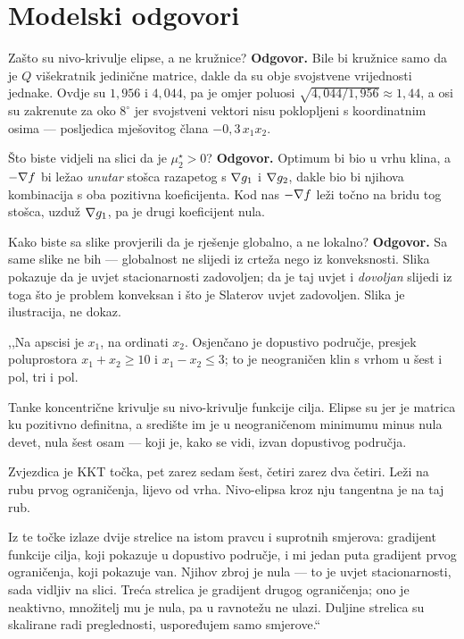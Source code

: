 \section{Modelski odgovori}
\label{sec:z1c-odgovori}

\begin{pitanje}{Zašto su nivo-krivulje elipse, a ne kružnice?}
\textbf{Odgovor.} Bile bi kružnice samo da je $Q$ višekratnik jedinične matrice,
dakle da su obje svojstvene vrijednosti jednake. Ovdje su $1{,}956$ i $4{,}044$,
pa je omjer poluosi $\sqrt{4{,}044/1{,}956} \approx 1{,}44$, a osi su zakrenute
za oko $8^\circ$ jer svojstveni vektori nisu poklopljeni s koordinatnim osima ---
posljedica mješovitog člana $-0{,}3\,x_1x_2$.
\end{pitanje}

\begin{pitanje}{Što biste vidjeli na slici da je $\mu_2^{\star} > 0$?}
\textbf{Odgovor.} Optimum bi bio u vrhu klina, a $-\nabla f$ bi ležao \emph{unutar}
stošca razapetog s $\nabla g_1$ i $\nabla g_2$, dakle bio bi njihova kombinacija s
oba pozitivna koeficijenta. Kod nas $-\nabla f$ leži točno na bridu tog stošca,
uzduž $\nabla g_1$, pa je drugi koeficijent nula.
\end{pitanje}

\begin{pitanje}{Kako biste sa slike provjerili da je rješenje globalno, a ne lokalno?}
\textbf{Odgovor.} Sa same slike ne bih --- globalnost ne slijedi iz crteža nego
iz konveksnosti. Slika pokazuje da je uvjet stacionarnosti zadovoljen; da je taj
uvjet i \emph{dovoljan} slijedi iz toga što je problem konveksan i što je
Slaterov uvjet zadovoljen. Slika je ilustracija, ne dokaz.
\end{pitanje}

\begin{izgovor}
,,Na apscisi je $x_1$, na ordinati $x_2$. Osjenčano je dopustivo područje,
presjek poluprostora $x_1 + x_2 \geq 10$ i $x_1 - x_2 \leq 3$; to je neograničen
klin s vrhom u šest i pol, tri i pol.

Tanke koncentrične krivulje su nivo-krivulje funkcije cilja. Elipse su jer je
matrica ku pozitivno definitna, a središte im je u neograničenom minimumu minus
nula devet, nula šest osam --- koji je, kako se vidi, izvan dopustivog područja.

Zvjezdica je KKT točka, pet zarez sedam šest, četiri zarez dva četiri. Leži na
rubu prvog ograničenja, lijevo od vrha. Nivo-elipsa kroz nju tangentna je na taj
rub.

Iz te točke izlaze dvije strelice na istom pravcu i suprotnih smjerova:
gradijent funkcije cilja, koji pokazuje u dopustivo područje, i mi jedan puta
gradijent prvog ograničenja, koji pokazuje van. Njihov zbroj je nula --- to je
uvjet stacionarnosti, sada vidljiv na slici. Treća strelica je gradijent drugog
ograničenja; ono je neaktivno, množitelj mu je nula, pa u ravnotežu ne ulazi.
Duljine strelica su skalirane radi preglednosti, uspoređujem samo smjerove.``
\end{izgovor}
